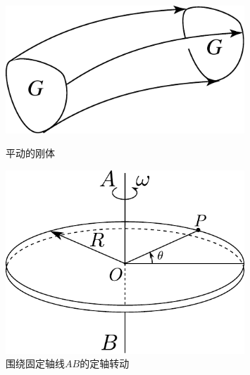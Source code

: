 \begin{figure}[h]

\begin{minipage}[t]{0.5\linewidth}
\centering
\includegraphics[width=0.8\textwidth]{images/rb-theory-2.pdf}
\caption{平动的刚体}
\label{fig: motion-平动的刚体}
\end{minipage}%
\begin{minipage}[t]{0.5\linewidth}
\centering
\includegraphics[width=0.8\textwidth]{images/rb-rotation-about-fixed-axis.pdf}
\caption{围绕固定轴线$AB$的定轴转动}
\label{fig: motion-rotation-about-fixed-axis}
\end{minipage}%
\end{figure}

